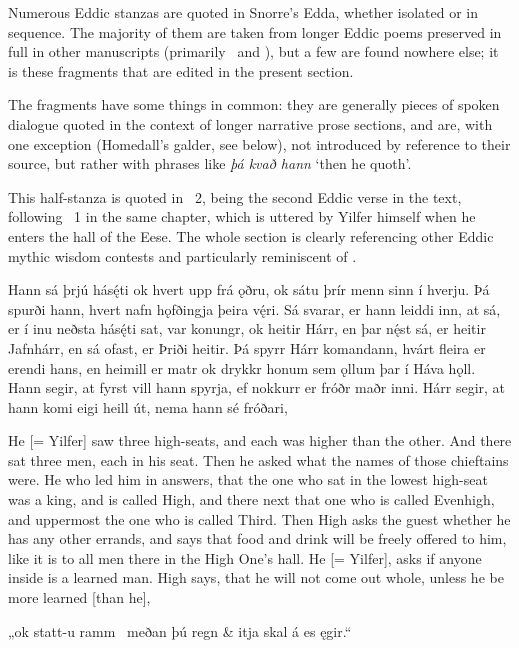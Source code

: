 
Numerous Eddic stanzas are quoted in Snorre’s Edda, whether isolated or in sequence.  The majority of them are taken from longer Eddic poems preserved in full in other manuscripts (primarily \Regius\ and \AM), but a few are found nowhere else; it is these fragments that are edited in the present section.

The fragments have some things in common: they are generally pieces of spoken dialogue quoted in the context of longer narrative prose sections, and are, with one exception (Homedall’s galder, see below), not introduced by reference to their source, but rather with phrases like \emph{þá kvað hann} ‘then he quoth’.

\sectionline

This half-stanza is quoted in \Gylfaginning\ 2, being the second Eddic verse in the text, following \Havamal\ 1 in the same chapter, which is uttered by Yilfer himself when he enters the hall of the Eese. The whole section is clearly referencing other Eddic mythic wisdom contests and particularly reminiscent of \Vafthrudnismal.

\bpg\bpa Hann sá þrjú hásę́ti ok hvert upp frá ǫðru, ok sátu þrír menn sinn í hverju. Þá spurði hann, hvert nafn hǫfðingja þeira vę́ri. Sá svarar, er hann leiddi inn, at sá, er í inu neðsta hásę́ti sat, var konungr, ok heitir Hárr, en þar nę́st sá, er heitir Jafnhárr, en sá ofast, er Þriði heitir. Þá spyrr Hárr komandann, hvárt fleira er erendi hans, en heimill er matr ok drykkr honum sem ǫllum þar í Háva hǫll. Hann segir, at fyrst vill hann spyrja, ef nokkurr er fróðr maðr inni. Hárr segir, at hann komi eigi heill út, nema hann sé fróðari,\epa

\bpb He [= Yilfer] saw three high-seats, and each was higher than the other. And there sat three men, each in his seat. Then he asked what the names of those chieftains were. He who led him in answers, that the one who sat in the lowest high-seat was a king, and is called High, and there next that one who is called Evenhigh, and uppermost the one who is called Third. Then High asks the guest whether he has any other errands, and says that food and drink will be freely offered to him, like it is to all men there in the High One’s hall. He [= Yilfer], asks if anyone inside is a learned man. High says, that he will not come out whole, unless he be more learned [than he],\epb\epg

\bvg\bva „ok statt-u ramm \hld\ meðan þú regn &
\ind {}itja skal á es ęgir.“\eva

